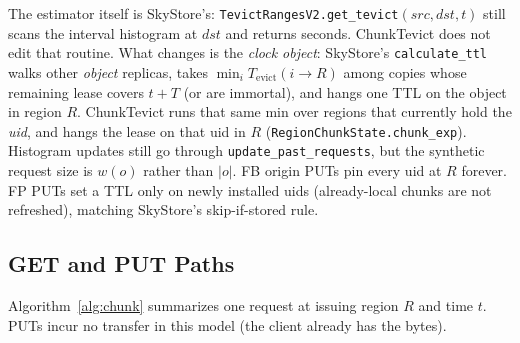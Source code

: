 The estimator itself is SkyStore's: \texttt{TevictRangesV2.get\_tevict}$(src,dst,t)$ still scans the interval histogram at $dst$ and returns seconds.
ChunkTevict does not edit that routine.
What changes is the \emph{clock object}:
SkyStore's \texttt{calculate\_ttl} walks other \emph{object} replicas, takes $\min_i T_{\mathrm{evict}}(i\!\to\!R)$ among copies whose remaining lease covers $t+T$ (or are immortal), and hangs one TTL on the object in region $R$.
ChunkTevict runs that same min over regions that currently hold the \emph{uid}, and hangs the lease on that uid in $R$ (\texttt{RegionChunkState.chunk\_exp}).
Histogram updates still go through \texttt{update\_past\_requests}, but the synthetic request size is $w(o)$ rather than $|o|$.
{FB} origin {PUT}s pin every uid at $R$ forever.
{FP} {PUT}s set a TTL only on newly installed uids (already-local chunks are not refreshed), matching SkyStore's skip-if-stored rule.

\subsection{{GET} and {PUT} Paths}

Algorithm~\ref{alg:chunk} summarizes one request at issuing region $R$ and time $t$.
{PUT}s incur no transfer in this model (the client already has the bytes).

